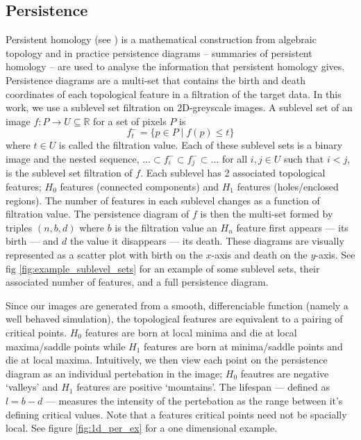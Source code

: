 \documentclass[pdflatex,sn-aps]{sn-jnl}%
\theoremstyle{thmstyleone}%
\theoremstyle{thmstyletwo}%
\theoremstyle{thmstylethree}%
\begin{document}
    \subsection{Persistence}\label{res:persistence}
    \par
    Persistent homology (see \cite{computational_homology, tda_review}) is a mathematical construction from algebraic topology and in practice persistence diagrams -- summaries of persistent homology -- are used to analyse the information that persistent homology gives.  Persistence diagrams are a multi-set that contains the birth and death coordinates of each topological feature in a filtration of the target data.  In this work, we use a sublevel set filtration on 2D-greyscale images.  A sublevel set of an image $f:P\to U \subseteq \mathbb{R}$ for a set of pixels $P$ is
    \[f_t^- = \{p \in P \mid f(p) \leq t\}\]
    where $t\in U$ is called the filtration value.  Each of these sublevel sets is a binary image and the nested sequence, $\ldots \subset f_i^- \subset f_j^- \subset \ldots$ for all $i,j \in U$ such that $i<j$, is the sublevel set filtration of $f$.  Each sublevel has 2 associated topological features; $H_0$ features (connected components) and $H_1$ features (holes/enclosed regions).  The number of features in each sublevel changes as a function of filtration value.  The persistence diagram of $f$ is then the multi-set formed by triples $(n,b,d)$ where $b$ is the filtration value an $H_n$ feature first appears --- its birth --- and $d$ the value it disappears --- its death.  These diagrams are visually represented as a scatter plot with birth on the $x$-axis and death on the $y$-axis.  See fig \ref{fig:example_sublevel_sets} for an example of some sublevel sets, their associated number of features, and a full persistence diagram.  
\par
    Since our images are generated from a smooth, differenciable function (namely a well behaved simulation), the topological features are equivalent to a pairing of critical points.  $H_0$ features are born at local minima and die at local maxima/saddle points while $H_1$ features are born at minima/saddle points and die at local maxima\cite{tda_review, KP_morse}.  Intuitively, we then view each point on the persistence diagram as an individual pertebation in the image; $H_0$ feautres are negative `valleys' and $H_1$ features are positive `mountains'.  The lifespan --- defined as $l=b-d$ --- measures the intensity of the pertebation as the range between it's defining critical values.  Note that a features critical points need not be spacially local.  See figure \ref{fig:1d_per_ex} for a one dimensional example.  
\end{document}
